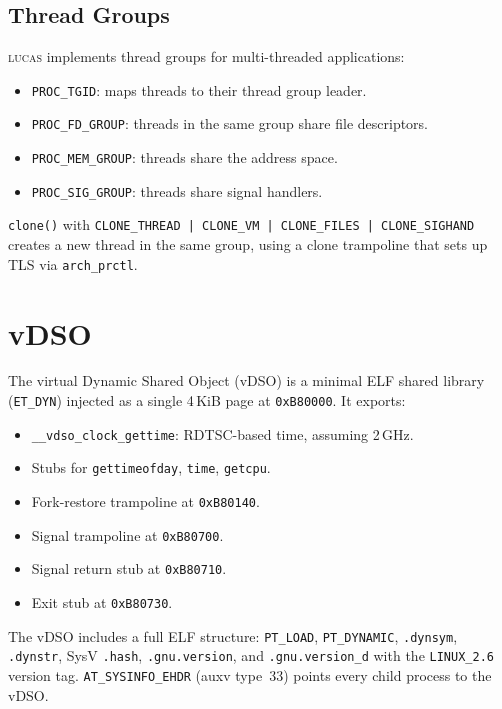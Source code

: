 \documentclass[11pt,a4paper,twoside]{report}
\theoremstyle{definition}
\newcommand{\LUCAS}{\textsc{lucas}}
\newcommand{\hex}[1]{\texttt{0x#1}}
\begin{document}
\subsection{Thread Groups}

\LUCAS{} implements thread groups for multi-threaded applications:

\begin{itemize}[leftmargin=1.4em]
  \item \texttt{PROC\_TGID}: maps threads to their thread group leader.
  \item \texttt{PROC\_FD\_GROUP}: threads in the same group share file
    descriptors.
  \item \texttt{PROC\_MEM\_GROUP}: threads share the address space.
  \item \texttt{PROC\_SIG\_GROUP}: threads share signal handlers.
\end{itemize}

\texttt{clone()} with \texttt{CLONE\_THREAD | CLONE\_VM | CLONE\_FILES |
CLONE\_SIGHAND} creates a new thread in the same group, using a clone
trampoline that sets up TLS via \texttt{arch\_prctl}.

\section{vDSO}

The virtual Dynamic Shared Object (vDSO) is a minimal ELF shared library
(\texttt{ET\_DYN}) injected as a single 4\,KiB page at \hex{B80000}. It
exports:

\begin{itemize}[leftmargin=1.4em]
  \item \texttt{\_\_vdso\_clock\_gettime}: RDTSC-based time, assuming 2\,GHz.
  \item Stubs for \texttt{gettimeofday}, \texttt{time}, \texttt{getcpu}.
  \item Fork-restore trampoline at \hex{B80140}.
  \item Signal trampoline at \hex{B80700}.
  \item Signal return stub at \hex{B80710}.
  \item Exit stub at \hex{B80730}.
\end{itemize}

The vDSO includes a full ELF structure: \texttt{PT\_LOAD}, \texttt{PT\_DYNAMIC},
\texttt{.dynsym}, \texttt{.dynstr}, SysV \texttt{.hash},
\texttt{.gnu.version}, and \texttt{.gnu.version\_d} with the
\texttt{LINUX\_2.6} version tag. \texttt{AT\_SYSINFO\_EHDR} (auxv type~33)
points every child process to the vDSO.
\end{document}
